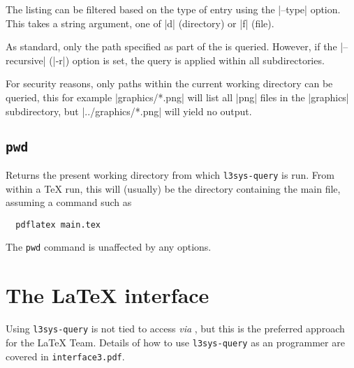 \documentclass{l3doc}
\begin{document}
\begin{documentation}
The listing can be filtered based on the type of entry using the |--type|
option. This takes a string argument, one of |d| (directory) or |f| (file).

As standard, only the path specified as part of the  is queried.
However, if the |--recursive| (|-r|) option is set, the query is applied within
all subdirectories.

For security reasons, only paths within the current working directory can be
queried, this for example |graphics/*.png| will list all |png| files in the
|graphics| subdirectory, but |../graphics/*.png| will yield no output.

\subsection{\texttt{pwd}}

Returns the present working directory from which \texttt{l3sys-query} is run.
From within a \TeX{} run, this will (usually) be the directory containing the
main file, assuming a command such as
\begin{verbatim}
  pdflatex main.tex
\end{verbatim}
The \texttt{pwd} command is unaffected by any options.

\section{The \LaTeX{} interface}

Using \texttt{l3sys-query} is not tied to access \emph{via} , but
this is the preferred approach for the \LaTeX{} Team. Details of how to use
\texttt{l3sys-query} as an  programmer are covered in
\texttt{interface3.pdf}.

\end{documentation}

\PrintIndex
\end{document}

